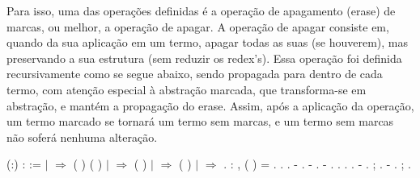  Para isso, uma das operações definidas é a operação de apagamento (erase) de marcas, ou melhor,
a operação de apagar. A operação de apagar consiste em, quando da sua aplicação em um termo, apagar
todas as suas (se houverem), mas preservando a sua estrutura (sem reduzir os redex's). Essa operação
foi definida recursivamente como se segue abaixo, sendo propagada para dentro de cada termo, com atenção
especial à abstração marcada, que transforma-se em abstração, e mantém a propagação do erase. Assim, 
após a aplicação da operação, um termo marcado se tornará um termo sem marcas, e um termo sem marcas não
soferá nenhuma alteração.\begin{coqdoccode}
\coqdocemptyline
\coqdocnoindent
{}  (:) :  :=\coqdoceol
\coqdocindent{1.00em}
  \coqdoceol
\coqdocindent{1.00em}
\ensuremath{|}    \ensuremath{\Rightarrow}  ( ) ( )\coqdoceol
\coqdocindent{1.00em}
\ensuremath{|}   \ensuremath{\Rightarrow}  ( )\coqdoceol
\coqdocindent{1.00em}
\ensuremath{|}   \ensuremath{\Rightarrow}  ( )\coqdoceol
\coqdocindent{1.00em}
\ensuremath{|} \coqdocvar{\_} \ensuremath{\Rightarrow} \coqdoceol
\coqdocindent{1.00em}
.\coqdoceol
\coqdocemptyline
\coqdocemptyline
\coqdocnoindent
{} : \coqdockw{\ensuremath{\forall}} ,  ( ) =  .\coqdoceol
\coqdocnoindent
{}.\coqdoceol
\coqdocindent{1.00em}
 .\coqdoceol
\coqdocindent{1.00em}
- .\coqdoceol
\coqdocindent{1.00em}
- .\coqdoceol
\coqdocindent{1.00em}
- .\coqdoceol
\coqdocindent{2.00em}
 .\coqdoceol
\coqdocindent{2.00em}
 .\coqdoceol
\coqdocindent{2.00em}
.\coqdoceol
\coqdocindent{1.00em}
- .\coqdoceol
\coqdocindent{2.00em}
 ; .\coqdoceol
\coqdocindent{1.00em}
- .\coqdoceol
\coqdocindent{2.00em}
 ; .\coqdoceol

\end{coqdoccode}
